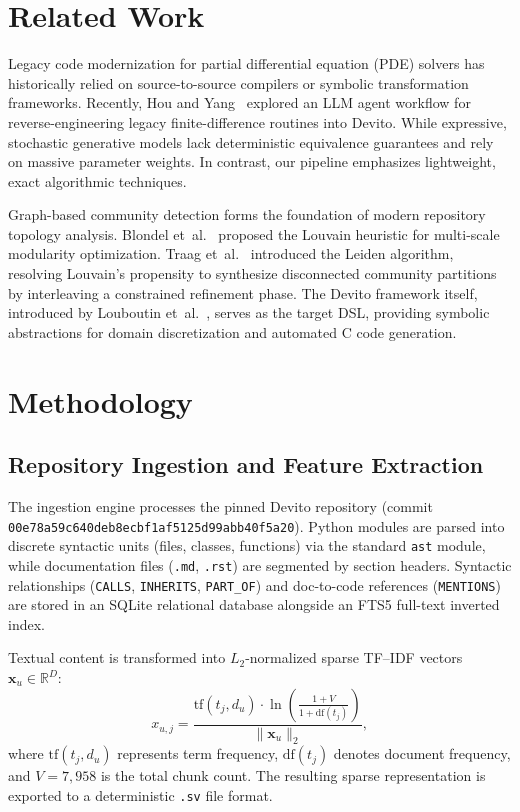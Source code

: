 \documentclass[conference]{IEEEtran}
\begin{document}
\section{Related Work}
Legacy code modernization for partial differential equation (PDE) solvers has historically relied on source-to-source compilers or symbolic transformation frameworks. Recently, Hou and Yang~\cite{hou2026agent} explored an LLM agent workflow for reverse-engineering legacy finite-difference routines into Devito. While expressive, stochastic generative models lack deterministic equivalence guarantees and rely on massive parameter weights. In contrast, our pipeline emphasizes lightweight, exact algorithmic techniques.

Graph-based community detection forms the foundation of modern repository topology analysis. Blondel et~al.~\cite{blondel2008fast} proposed the Louvain heuristic for multi-scale modularity optimization. Traag et~al.~\cite{traag2019leiden} introduced the Leiden algorithm, resolving Louvain's propensity to synthesize disconnected community partitions by interleaving a constrained refinement phase. The Devito framework itself, introduced by Louboutin et~al.~\cite{louboutin2019devito}, serves as the target DSL, providing symbolic abstractions for domain discretization and automated C code generation.

\section{Methodology}
\subsection{Repository Ingestion and Feature Extraction}
The ingestion engine processes the pinned Devito repository (commit \texttt{00e78a59c640deb8ecbf1af5125d99abb40f5a20}). Python modules are parsed into discrete syntactic units (files, classes, functions) via the standard \texttt{ast} module, while documentation files (\texttt{.md}, \texttt{.rst}) are segmented by section headers. Syntactic relationships (\texttt{CALLS}, \texttt{INHERITS}, \texttt{PART\_OF}) and doc-to-code references (\texttt{MENTIONS}) are stored in an SQLite relational database alongside an FTS5 full-text inverted index. 

Textual content is transformed into $L_2$-normalized sparse TF--IDF vectors $\mathbf{x}_u \in \mathbb{R}^D$:
\begin{equation}
\label{eq:tfidf}
x_{u,j} = \frac{\mathrm{tf}(t_j, d_u) \cdot \ln\left(\frac{1 + V}{1 + \mathrm{df}(t_j)}\right)}{\|\mathbf{x}_u\|_2},
\end{equation}
where $\mathrm{tf}(t_j, d_u)$ represents term frequency, $\mathrm{df}(t_j)$ denotes document frequency, and $V=7,958$ is the total chunk count. The resulting sparse representation is exported to a deterministic \texttt{.sv} file format.
\end{document}
